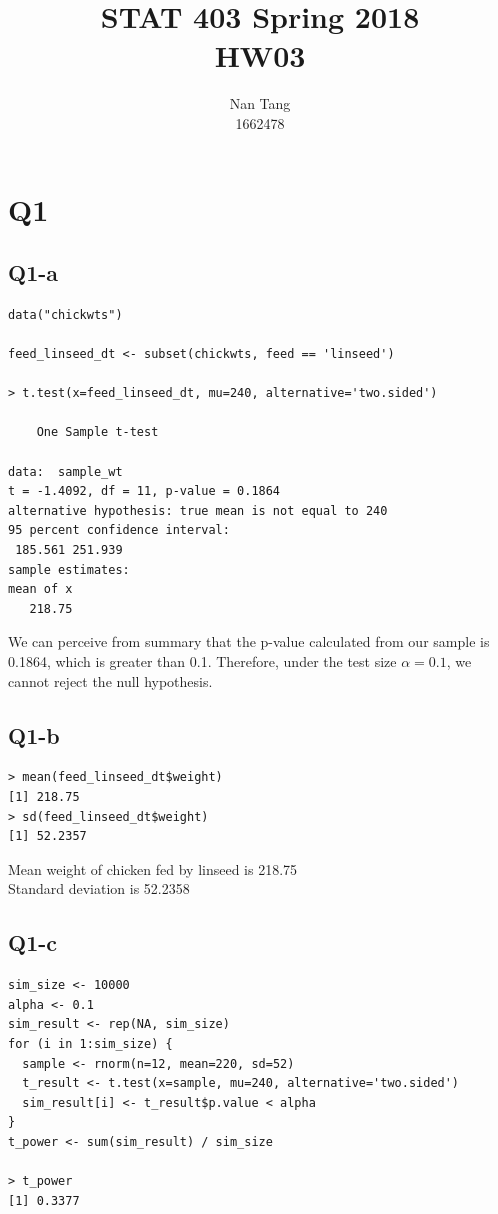 \documentclass[12pt,letterpaper]{article}
\author{Nan Tang\\1662478}
\title{STAT 403 Spring 2018\\HW03}
\begin{document}
\maketitle

\section*{Q1}

\subsection*{Q1-a}

\begin{verbatim}
data("chickwts")

feed_linseed_dt <- subset(chickwts, feed == 'linseed')

> t.test(x=feed_linseed_dt, mu=240, alternative='two.sided')

	One Sample t-test

data:  sample_wt
t = -1.4092, df = 11, p-value = 0.1864
alternative hypothesis: true mean is not equal to 240
95 percent confidence interval:
 185.561 251.939
sample estimates:
mean of x 
   218.75 
\end{verbatim}

\noindent We can perceive from summary that the p-value calculated from our sample is 0.1864, which is greater than 0.1. Therefore, under the test size $\alpha = 0.1$, we cannot reject the null hypothesis.\\

\newpage
\subsection*{Q1-b}

\begin{verbatim}
> mean(feed_linseed_dt$weight)
[1] 218.75
> sd(feed_linseed_dt$weight)
[1] 52.2357
\end{verbatim}

\noindent Mean weight of chicken fed by linseed is 218.75 \\
Standard deviation is 52.2358 \\

\subsection*{Q1-c}
\begin{verbatim}
sim_size <- 10000
alpha <- 0.1
sim_result <- rep(NA, sim_size)
for (i in 1:sim_size) {
  sample <- rnorm(n=12, mean=220, sd=52)
  t_result <- t.test(x=sample, mu=240, alternative='two.sided')
  sim_result[i] <- t_result$p.value < alpha
}
t_power <- sum(sim_result) / sim_size

> t_power
[1] 0.3377
\end{verbatim}
\end{document}
